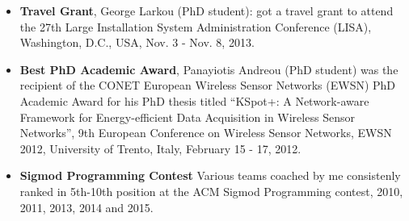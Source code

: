 \documentclass[10pt]{article}
\begin{document}
\begin{itemize}
\item {\bf Travel Grant}, George Larkou (PhD student): got a travel grant to attend the 27th Large Installation System Administration Conference (LISA), Washington, D.C., USA, Nov. 3 - Nov. 8, 2013.
\item  {\bf Best PhD Academic Award}, Panayiotis Andreou (PhD student) was the recipient of the CONET European Wireless Sensor Networks (EWSN) PhD Academic Award for his PhD thesis titled ``KSpot+: A Network-aware Framework for Energy-efficient Data Acquisition in Wireless Sensor Networks'', 9th European Conference on Wireless Sensor Networks, EWSN 2012, University of Trento, Italy, February 15 - 17, 2012.
\item {\bf Sigmod Programming Contest} Various teams coached by me consistenly ranked in 5th-10th position at the ACM Sigmod Programming contest, 2010, 2011, 2013, 2014 and 2015.
\end{itemize}

\newpage

	
\end{document}
